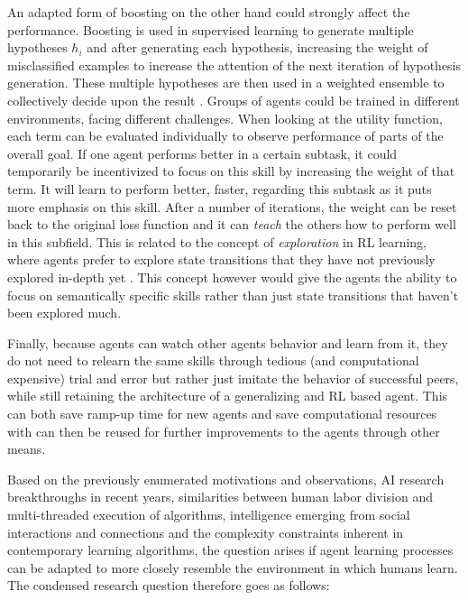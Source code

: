 \documentclass[12pt,a4paper]{article}
\begin{document}
An adapted form of boosting on the other hand could strongly affect the performance. Boosting is used in supervised learning to generate multiple hypotheses $h_i$ and after generating each hypothesis, increasing the weight of misclassified examples to increase the attention of the next iteration of hypothesis generation. These multiple hypotheses are then used in a weighted ensemble to collectively decide upon the result \cite[p.749 ff.]{russell2016artificial}. Groups of agents could be trained in different environments, facing different challenges. When looking at the utility function, each term can be evaluated individually to observe performance of parts of the overall goal. If one agent performs better in a certain subtask, it could temporarily be incentivized to focus on this skill by increasing the weight of that term. It will learn to perform better, faster, regarding this subtask as it puts more emphasis on this skill. After a number of iterations, the weight can be reset back to the original loss function and it can \emph{teach} the others how to perform well in this subfield. This is related to the concept of \emph{exploration} in \ac{RL} learning, where agents prefer to explore state transitions that they have not previously explored in-depth yet \cite[p.839f.]{russell2016artificial}. This concept however would give the agents the ability to focus on semantically specific skills rather than just state transitions that haven't been explored much.

Finally, because agents can watch other agents behavior and learn from it, they do not need to relearn the same skills through tedious (and computational expensive) trial and error but rather just imitate the behavior of successful peers, while still retaining the architecture of a generalizing and \ac{RL} based agent. This can both save ramp-up time for new agents and save computational resources with can then be reused for further improvements to the agents through other means.

Based on the previously enumerated motivations and observations, AI research breakthroughs in recent years, similarities between human labor division and multi-threaded execution of algorithms, intelligence emerging from social interactions and connections and the complexity constraints inherent in contemporary learning algorithms, the question arises if agent learning processes can be adapted to more closely resemble the environment in which humans learn. The condensed research question therefore goes as follows:
\end{document}
